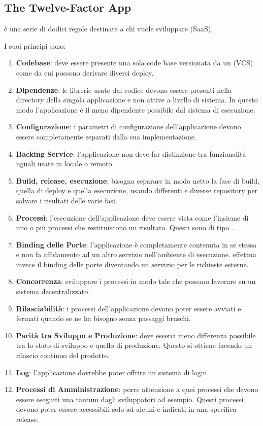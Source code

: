 \subsection{The Twelve-Factor App}
 è una serie di dodici regole destinate a chi vuole sviluppare  (SaaS).

I suoi principi sono:

\begin{enumerate}
	\item \textbf{Codebase}: deve essere presente una sola code base versionata da un  (VCS) come  da cui
	possono derivare diversi deploy.
	\item \textbf{Dipendenze}: le librerie usate dal codice devono essere presenti nella directory della singola applicazione e non attive a livello di sistema. In questo modo l'applicazione è il meno dipendente possibile dal sistema di esecuzione.
	\item \textbf{Configurazione}: i parametri di configurazione dell'applicazione devono essere completamente separati dalla sua implementazione.
	\item \textbf{Backing Service}: l'applicazione non deve far distinzione tra funzionalità uguali usate in locale o remoto.
	\item \textbf{Build, release, esecuzione}: bisogna separare in modo netto la fase di build, quella di deploy e quella esecuzione, usando  differenti e diverse repository per salvare i risultati delle varie fasi.
	\item \textbf{Processi}: l'esecuzione dell'applicazione deve essere vista come l'insieme di uno o più processi che restituiscono un risultato. Questi sono di tipo .
	\item \textbf{Binding delle Porte}: l'applicazione è completamente contenuta in se stessa e non fa affidamento ad un altro servizio nell'ambiente di esecuzione. effettua invece il binding delle porte diventando un servizio per le richieste esterne.
	\item \textbf{Concorrenza}: sviluppare i processi in modo tale che possano lavorare su un sistema decentralizzato.
	\item \textbf{Rilasciabilità}: i processi dell'applicazione devono poter essere avviati e fermati quando se ne ha bisogno senza passaggi bruschi.
	\item \textbf{Parità tra Sviluppo e Produzione}: deve esserci meno differenza possibile tra lo stato di sviluppo e quello di produzione. Questo si ottiene facendo un rilascio continuo del prodotto.
	\item \textbf{Log}: l'applicazione dovrebbe poter offrire un sistema di login.
	\item \textbf{Processi di Amministrazione}: porre attenzione a quei processi che devono essere eseguiti una tantum dagli sviluppatori ad esempio. Questi processi devono poter essere accessibili solo ad alcuni e indicati in una specifica release.
\end{enumerate}

